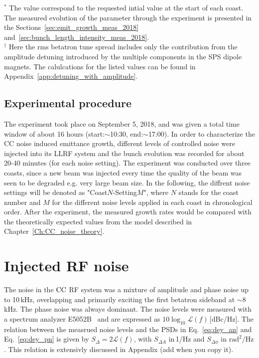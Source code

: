 \begin{table}[!hbt]
\begin{minipage}{\textwidth}
\begin{centering}
   \label{tab:machine_beam_param_2018}
   \end{centering} \footnotesize{$^\ast$ The value correspond to the requested intial value at the start of each coast. The measured evolution of the parameter through the experiment is presented in the Sections~\ref{sec:emit_growth_meas_2018} and~\ref{sec:bunch_length_intensity_meas_2018}.\\$^\dagger$ Here the rms betatron tune spread includes only the contribution from the amplitude detuning introduced by the multiple components in the SPS dipole magnets. The calulcations for the listed values can be found in Appendix~\ref{app:detuning_with_amplitude}.}
   \end{minipage}
\end{table}


\subsection{Experimental procedure}\label{sec:experimental_procedure_2018}
The experiment took place on September 5, 2018, and was given a total time window of about 16 hours (start:$\sim$10:30, end:$\sim$17:00). In order to characterize the CC noise induced emittance growth, different levels of controlled noise were injected into its LLRF system and the bunch evolution was recorded for about 20-40 minutes (for each noise setting). The experiment was conducted over three coasts, since a new beam was injected every time the quality of the beam was seen to be degraded e.g. very large beam size. In the following, the diffrent noise settings will be denoted as "Coast$N$-Setting$M$", where $N$ stands for the coast number and $M$ for the different noise levels applied in each coast in chronological order. After the experiment, the measured growth rates would be compared with the theoretically expected values from the model described in Chapter~\ref{Ch:CC_noise_theory}.

\section{Injected RF noise}\label{sec:injected_RF_noise}
The noise in the ${\mathrm{CC}}$ RF system was a mixture of amplitude and phase noise up to 10\,kHz, overlapping and primarily exciting the first betatron sideband at $\sim 8$\,kHz. The phase noise was always dominant. The noise levels were measured with a spectrum analyzer E5052B~\cite{E5052B_insight} and are expressed as $10\log_{10}\mathcal{L}(f)$\,[dBc/Hz]. The relation between the measrued noise levels and the PSDs in Eq.~\eqref{eq:dey_an} and Eq.~\eqref{eq:dey_pn} is given by $S_\Delta = 2\mathcal{L}(f)$, with $S_{\Delta A}$ in\,1/Hz and $S_{\Delta \phi}$ in $\mathrm{rad^2/Hz}$. This relation is extensivly discussed in Appendix (add when you copy it).


